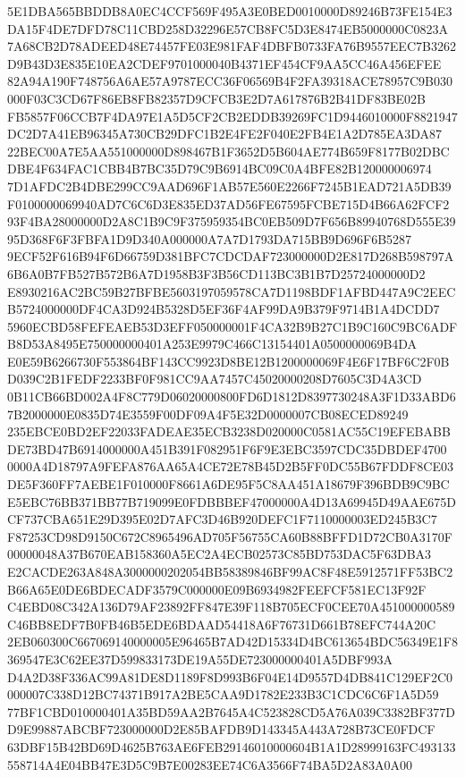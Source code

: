 \documentclass[UTF8,fontset=fandol,zihao=-4,a4paper]{ctexart}
\begin{document}
{{5E1DBA565BBDDB8A0EC4CCF569F495A3E0BED0010000D89246B73FE154E3DA15F4DE7DFD78C11CBD258D32296E57CB8FC5D3E8474EB5000000C0823A
7A68CB2D78ADEED48E74457FE03E981FAF4DBFB0733FA76B9557EEC7B3262D9B43D3E835E10EA2CDEF9701000040B4371EF454CF9AA5CC46A456EFEE
82A94A190F748756A6AE57A9787ECC36F06569B4F2FA39318ACE78957C9B030000F03C3CD67F86EB8FB82357D9CFCB3E2D7A617876B2B41DF83BE02B
FB5857F06CCB7F4DA97E1A5D5CF2CB2EDDB39269FC1D9446010000F8821947DC2D7A41EB96345A730CB29DFC1B2E4FE2F040E2FB4E1A2D785EA3DA87
22BEC00A7E5AA551000000D898467B1F3652D5B604AE774B659F8177B02DBCDBE4F634FAC1CBB4B7BC35D79C9B6914BC09C0A4BFE82B120000006974
7D1AFDC2B4DBE299CC9AAD696F1AB57E560E2266F7245B1EAD721A5DB39F0100000069940AD7C6C6D3E835ED37AD56FE67595FCBE715D4B66A62FCF2
93F4BA28000000D2A8C1B9C9F375959354BC0EB509D7F656B89940768D555E3995D368F6F3FBFA1D9D340A000000A7A7D1793DA715BB9D696F6B5287
9ECF52F616B94F6D66759D381BFC7CDCDAF723000000D2E817D268B598797A6B6A0B7FB527B572B6A7D1958B3F3B56CD113BC3B1B7D25724000000D2
E8930216AC2BC59B27BFBE5603197059578CA7D1198BDF1AFBD447A9C2EECB5724000000DF4CA3D924B5328D5EF36F4AF99DA9B379F9714B1A4DCDD7
5960ECBD58FEFEAEB53D3EFF050000001F4CA32B9B27C1B9C160C9BC6ADFB8D53A8495E750000000401A253E9979C466C13154401A0500000069B4DA
E0E59B6266730F553864BF143CC9923D8BE12B1200000069F4E6F17BF6C2F0BD039C2B1FEDF2233BF0F981CC9AA7457C45020000208D7605C3D4A3CD
0B11CB66BD002A4F8C779D06020000800FD6D1812D8397730248A3F1D33ABD67B2000000E0835D74E3559F00DF09A4F5E32D0000007CB08ECED89249
235EBCE0BD2EF22033FADEAE35ECB3238D020000C0581AC55C19EFEBABBDE73BD47B6914000000A451B391F082951F6F9E3EBC3597CDC35DBDEF4700
0000A4D18797A9FEFA876AA65A4CE72E78B45D2B5FF0DC55B67FDDF8CE03DE5F360FF7AEBE1F010000F8661A6DE95F5C8AA451A18679F396BDB9C9BC
E5EBC76BB371BB77B719099E0FDBBBEF47000000A4D13A69945D49AAE675DCF737CBA651E29D395E02D7AFC3D46B920DEFC1F7110000003ED245B3C7
F87253CD98D9150C672C8965496AD705F56755CA60B88BFFD1D72CB0A3170F00000048A37B670EAB158360A5EC2A4ECB02573C85BD753DAC5F63DBA3
E2CACDE263A848A3000000202054BB58389846BF99AC8F48E5912571FF53BC2B66A65E0DE6BDECADF3579C000000E09B6934982FEEFCF581EC13F92F
C4EBD08C342A136D79AF23892FF847E39F118B705ECF0CEE70A451000000589C46BB8EDF7B0FB46B5EDE6BDAAD54418A6F76731D661B78EFC744A20C
2EB060300C667069140000005E96465B7AD42D15334D4BC613654BDC56349E1F8369547E3C62EE37D599833173DE19A55DE723000000401A5DBF993A
D4A2D38F336AC99A81DE8D1189F8D993B6F04E14D9557D4DB841C129EF2C0000007C338D12BC74371B917A2BE5CAA9D1782E233B3C1CDC6C6F1A5D59
77BF1CBD010000401A35BD59AA2B7645A4C523828CD5A76A039C3382BF377DD9E99887ABCBF723000000D2E85BAFDB9D143345A443A728B73CE0FDCF
63DBF15B42BD69D4625B763AE6FEB29146010000604B1A1D28999163FC493133558714A4E04BB47E3D5C9B7E00283EE74C6A3566F74BA5D2A83A0A00
}}
\end{document}
